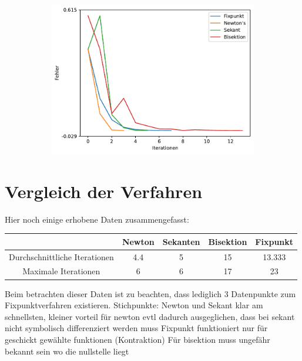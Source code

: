 \documentclass[10pt]{scrartcl}
\newcommand{\1}{1\hspace{-0,9ex}1}
\begin{document}
\begin{figure}[!h]
\begin{subfigure}[b]{0.4\textwidth}
			\includegraphics[width=\textwidth]{plots/plot4.pdf}
		\end{subfigure}
	\end{figure}
	\section*{Vergleich der Verfahren}
	Hier noch einige erhobene Daten zusammengefasst:
	\begin{table}[!h]
		\centering
		\begin{tabular}{|c|c|c|c|c|} \hline
									  & Newton & Sekanten & Bisektion & Fixpunkt \\ \hline
		Durchschnittliche Iterationen & 4.4                & 5                  & 15                   & 13.333             \\ \hline
		Maximale Iterationen          & 6                  & 6                  & 17                   & 23                 \\ \hline
		\end{tabular}
	\end{table}

	Beim betrachten dieser Daten ist zu beachten, dass lediglich 3 Datenpunkte zum Fixpunktverfahren existieren.
	Stichpunkte:
	Newton und Sekant klar am schnellsten, kleiner vorteil für newton evtl dadurch ausgeglichen, dass bei sekant nicht symbolisch differenziert werden muss
	Fixpunkt funktioniert nur für geschickt gewählte funktionen (Kontraktion)
	Für bisektion muss ungefähr bekannt sein wo die nullstelle liegt
\end{document}
